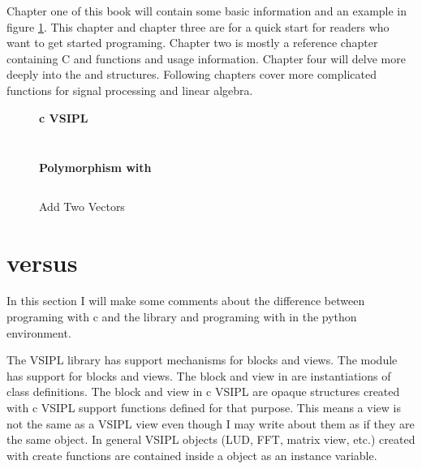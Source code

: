 Chapter one of this book will contain some basic information and an example in figure \ref{fig:addTwoVectors}. This chapter and chapter three are for a quick start for readers who want to get started programing. Chapter two is mostly a reference chapter containing C and \pyjv{} functions and usage information.  Chapter four will delve more deeply into the  and  structures.  Following chapters cover more complicated functions for signal processing and linear algebra.
%
\clearpage
\begin{figure}[t]
\caption{Add Two Vectors}
\label{fig:addTwoVectors}
\setlength{\parskip}{.25cm}
\begin{minipage}[t][20cm][t]{.475\textwidth}
{\begin{center} \bfseries{c VSIPL} \end{center}}\setlength{\parskip}{.25cm}
\inputminted[linenos=true,resetmargins=true,xleftmargin=.75cm,fontfamily=tt, fontsize= \small]{c}{./c_examples/example1.c}
\end{minipage}
\begin{minipage}[t][10cm][t]{.475\textwidth}
{\begin{center} \bfseries{\pyjv} \end{center}}\setlength{\parskip}{.25cm}
\inputminted[linenos=true,resetmargins=true,xleftmargin=.75cm,fontfamily=tt,fontsize=\small]{python}{./pyJvsip_examples/example1a.py}\setlength{\parskip}{.25cm}
{\begin{center} \bfseries{Polymorphism with \pyjv} \end{center}}\setlength{\parskip}{.25cm}
\inputminted[linenos=true,resetmargins=true,xleftmargin=.75cm,fontfamily=tt,fontsize=\small]{python}{./pyJvsip_examples/example1b.py}
\end{minipage}
\end{figure}
%
\section*{ versus \pyjv}
In this section I will make some comments about the difference between programing with c and the  library and programing with \pyjv{} in the python environment. 

The VSIPL library has support mechanisms for blocks and views. The \pyjv{} module has support for blocks and views. The block and view in \pyjv{} are instantiations of class definitions. The block and view in c VSIPL are opaque structures created with c VSIPL support functions defined for that purpose. This means a \pyjv{} view is not the same as a VSIPL view even though I may write about them as if they are the same object. In general VSIPL objects (LUD, FFT, matrix view, etc.) created with create functions are contained inside a \pyjv{} object as an instance variable.

